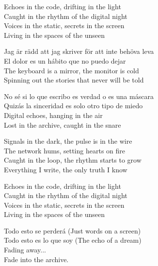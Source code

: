 \begin{lyrics}
Echoes in the code, drifting in the light\\
Caught in the rhythm of the digital night\\
Voices in the static, secrets in the screen\\
Living in the spaces of the unseen

Jag är rädd att jag skriver för att inte behöva leva\\
El dolor es un hábito que no puedo dejar\\
The keyboard is a mirror, the monitor is cold\\
Spinning out the stories that never will be told

No sé si lo que escribo es verdad o es una máscara\\
Quizás la sinceridad es solo otro tipo de miedo\\
Digital echoes, hanging in the air\\
Lost in the archive, caught in the snare

Signals in the dark, the pulse is in the wire\\
The network hums, setting hearts on fire\\
Caught in the loop, the rhythm starts to grow\\
Everything I write, the only truth I know

Echoes in the code, drifting in the light\\
Caught in the rhythm of the digital night\\
Voices in the static, secrets in the screen\\
Living in the spaces of the unseen

Todo esto se perderá
(Just words on a screen)\\
Todo esto es lo que soy
(The echo of a dream)\\
Fading away...\\
Fade into the archive.
\end{lyrics}

